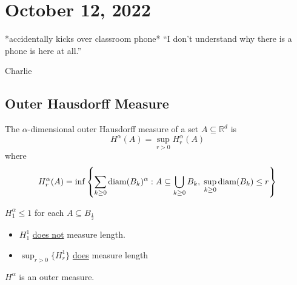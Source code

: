 \section{October 12, 2022}

\epigraph{*accidentally kicks over classroom phone* ``I don't understand why there is a phone is here at all.''}{Charlie}

\subsection{Outer Hausdorff Measure}
The $\alpha$-dimensional outer Hausdorff measure of a set $A \subseteq \mathbb{R}^d$ is
\[
	H^{\alpha} (A) = \sup_{r > 0} H_{r}^{\alpha} (A)
\]
where
\[
	H_{r}^{\alpha} (A) = \inf\left\{ \sum_{k \geq 0} \operatorname*{diam} (B_k)^{\alpha} : A \subseteq \bigcup_{k \geq 0} B_k, \; \sup_{k \geq 0} \operatorname*{diam} (B_{k} ) \leq r \right\}
\]

\begin{example}
	$H_{1}^{\alpha} \leq 1$ for each $A \subseteq B_{\frac{1}{2}}$
  \begin{itemize}
		\item $H_{1}^{1}$ \underline{does not} measure length.
		\item $\sup_{r > 0} \{H_{r}^{1}\}$ \underline{does} measure length
  \end{itemize}
\end{example}

\begin{lemma}
	$H^{\alpha}$ is an outer measure.
\end{lemma}

